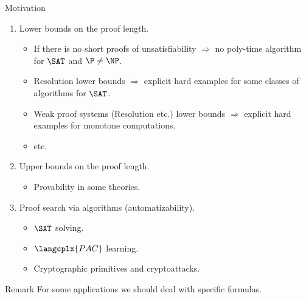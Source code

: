 \begin{frame}{Motivation}

    \begin{enumerate}
        \item Lower bounds on the proof length.
            \begin{itemize}
                \item If there is no short proofs of unsatisfiability $\Rightarrow$ no poly-time
                    algorithm for $\SAT$ and $\P \neq \NP$.
                    \pause
                \item Resolution lower bounds $\Rightarrow$ explicit hard examples for some classes of
                    algorithms for $\SAT$.
                    \pause
                \item Weak proof systems (Resolution etc.) lower bounds $\Rightarrow$ explicit hard
                    examples for \alert{monotone} computations.
                    \pause
                \item etc.
            \end{itemize}
        \pause
        \item Upper bounds on the proof length.
            \begin{itemize}
                \item Provability in some theories.
            \end{itemize}
        \pause
        \item Proof search via algorithms (automatizability).
            \begin{itemize}
                \item $\SAT$ solving.
                \pause
                \item $\langcplx{PAC}$ learning.
                \pause
                \item Cryptographic primitives and cryptoattacks.
            \end{itemize}            
    \end{enumerate}

    \pause
    \vspace{0.5cm}
    \begin{block}{Remark}
        For some applications we should deal with specific formulas.        
    \end{block}
\end{frame}

